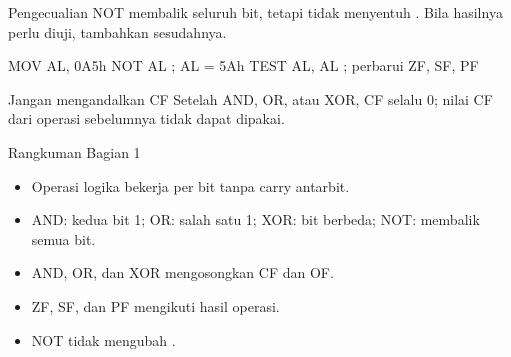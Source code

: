 \documentclass[aspectratio=169,11pt]{beamer}
\begin{document}
\begin{frame}[fragile]{Pengecualian NOT}
\small
{} membalik seluruh bit, tetapi tidak menyentuh
. Bila hasilnya perlu diuji, tambahkan 
sesudahnya.

\vspace{0.2em}
\begin{kodeasm}[numbers=none]
MOV AL, 0A5h
NOT AL              ; AL = 5Ah
TEST AL, AL         ; perbarui ZF, SF, PF
\end{kodeasm}

\vspace{0.15em}
\begin{alertblock}{Jangan mengandalkan CF}
\small Setelah AND, OR, atau XOR, CF selalu 0; nilai CF dari operasi
sebelumnya tidak dapat dipakai.
\end{alertblock}
\end{frame}

\begin{frame}{Rangkuman Bagian 1}
\small
\begin{itemize}
    \item Operasi logika bekerja per bit tanpa carry antarbit.

    \vspace{0.15em}
    \item AND: kedua bit 1; OR: salah satu 1; XOR: bit berbeda;
          NOT: membalik semua bit.

    \vspace{0.15em}
    \item AND, OR, dan XOR mengosongkan CF dan OF.

    \vspace{0.15em}
    \item ZF, SF, dan PF mengikuti hasil operasi.

    \vspace{0.15em}
    \item NOT tidak mengubah .
\end{itemize}
\end{frame}

\end{document}
